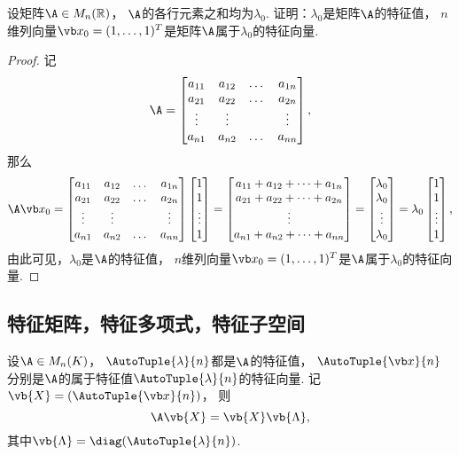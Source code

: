 \begin{example}
设矩阵\(\A \in M_n(\mathbb{R})\)，
\(\A\)的各行元素之和均为\(\lambda_0\).
证明：\(\lambda_0\)是矩阵\(\A\)的特征值，
\(n\)维列向量\(\x_0=(1,\dotsc,1)^T\)是矩阵\(\A\)属于\(\lambda_0\)的特征向量.
\begin{proof}
记\[
	\A
	= \begin{bmatrix}
		a_{11} & a_{12} & \dots & a_{1n} \\
		a_{21} & a_{22} & \dots & a_{2n} \\
		\vdots & \vdots & & \vdots \\
		a_{n1} & a_{n2} & \dots & a_{nn}
	\end{bmatrix},
\]
那么\[
	\A \x_0
	= \begin{bmatrix}
		a_{11} & a_{12} & \dots & a_{1n} \\
		a_{21} & a_{22} & \dots & a_{2n} \\
		\vdots & \vdots & & \vdots \\
		a_{n1} & a_{n2} & \dots & a_{nn}
	\end{bmatrix}
	\begin{bmatrix}
		1 \\ 1 \\ \vdots \\ 1
	\end{bmatrix}
	= \begin{bmatrix}
		a_{11} + a_{12} + \dotsb + a_{1n} \\
		a_{21} + a_{22} + \dotsb + a_{2n} \\
		\vdots \\
		a_{n1} + a_{n2} + \dotsb + a_{nn}
	\end{bmatrix}
	= \begin{bmatrix}
		\lambda_0 \\ \lambda_0 \\ \vdots \\ \lambda_0
	\end{bmatrix}
	= \lambda_0
	\begin{bmatrix}
		1 \\ 1 \\ \vdots \\ 1
	\end{bmatrix},
\]
由此可见，\(\lambda_0\)是\(\A\)的特征值，
\(n\)维列向量\(\x_0=(1,\dotsc,1)^T\)是\(\A\)属于\(\lambda_0\)的特征向量.
\end{proof}
\end{example}

\subsection{特征矩阵，特征多项式，特征子空间}
\begin{proposition}
设\(\A \in M_n(K)\)，
\(\AutoTuple{\lambda}{n}\)都是\(\A\)的特征值，
\(\AutoTuple{\x}{n}\)分别是\(\A\)的属于特征值\(\AutoTuple{\lambda}{n}\)的特征向量.
记\(\vb{X} = (\AutoTuple{\x}{n})\)，
则\[
	\A \vb{X} = \vb{X} \vb{\Lambda},
\]
其中\(\vb{\Lambda} = \diag(\AutoTuple{\lambda}{n})\).
\end{proposition}

